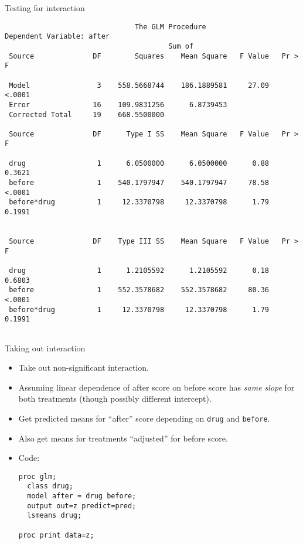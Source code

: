 \documentclass[pdf]{prosper}
\begin{document}
\begin{slide}{Testing for interaction}

{\scriptsize
\begin{verbatim}
                               The GLM Procedure
Dependent Variable: after
                                       Sum of
 Source              DF        Squares    Mean Square   F Value   Pr > F

 Model                3    558.5668744    186.1889581     27.09   <.0001
 Error               16    109.9831256      6.8739453
 Corrected Total     19    668.5500000

 Source              DF      Type I SS    Mean Square   F Value   Pr > F

 drug                 1      6.0500000      6.0500000      0.88   0.3621
 before               1    540.1797947    540.1797947     78.58   <.0001
 before*drug          1     12.3370798     12.3370798      1.79   0.1991


 Source              DF    Type III SS    Mean Square   F Value   Pr > F

 drug                 1      1.2105592      1.2105592      0.18   0.6803
 before               1    552.3578682    552.3578682     80.36   <.0001
 before*drug          1     12.3370798     12.3370798      1.79   0.1991


\end{verbatim}
}
  
\end{slide}

\begin{slide}{Taking out interaction}

  \begin{itemize}
  \item Take out non-significant interaction.
  \item Assuming linear dependence of after score on before score has {\em same slope} for both treatments (though possibly different intercept).
  \item Get predicted means for ``after'' score depending on \verb-drug- and \verb-before-.
  \item Also get means for treatments ``adjusted'' for before score.

  \item Code:
\begin{verbatim}
proc glm;
  class drug;
  model after = drug before;
  output out=z predict=pred;
  lsmeans drug;

proc print data=z;

\end{verbatim}
  \end{itemize}
  
\end{slide}
\end{document}

